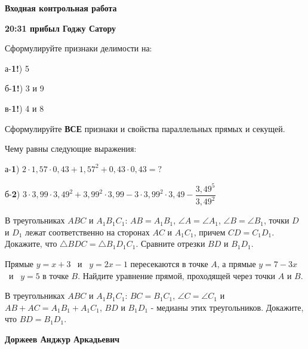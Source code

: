 \centerline{\bf \Huge Входная контрольная работа}
\centerline{\bf \Huge }

\begin{flushright}
        \scriptsize{\textbf{20:31 прибыл Годжу Сатору}}
\end{flushright}

 Сформулируйте признаки делимости на:

а-\textbf{1!}) 5

б-\textbf{1!}) 3 и 9

в-\textbf{1!}) 4 и 8

 Сформулируйте \textbf{ВСЕ} признаки и свойства параллельных прямых и секущей.

 Чему равны следующие выражения:

а-\textbf{1}) $2\cdot1,57\cdot0,43 + 1,57^2 + 0,43\cdot0,43=?$

б-\textbf{2}) $3\cdot3,99\cdot3,49^2 + 3,99^2\cdot3,99 - 3\cdot3,99^2\cdot3,49 - \dfrac{3,49^5}{3,49^2}$

 В треугольниках $ABC$ и $A_1B_1C_1$: $AB=A_1B_1$, $\angle A=\angle A_1$, $\angle B=\angle B_1$, точки $D$ и $D_1$ лежат соответственно на сторонах $AC$ и $A_1C_1$, причем $CD=C_1D_1$. Докажите, что $\triangle BDC = \triangle B_1D_1C_1$. Сравните отрезки $BD$ и $B_1D_1$.

 Прямые $y=x+3$ \ и \ $y=2x-1$ пересекаются в точке $A$, а прямые $y=7-3x$ \ и \ $y=5$ в точке $B$. Найдите уравнение прямой, проходящей через точки $A$ и $B$.

 В треугольниках $ABC$ и $A_1B_1C_1$: $BC=B_1C_1$, $\angle C=\angle C_1$ и $AB + AC = A_1B_1 + A_1C_1$, $BD$ и $B_1D_1$ - медианы этих треугольников. Докажите, что $BD=B_1D_1$.



\begin{flushright}
        \scriptsize{\textbf{Доржеев Анджур Аркадьевич}}
\end{flushright}